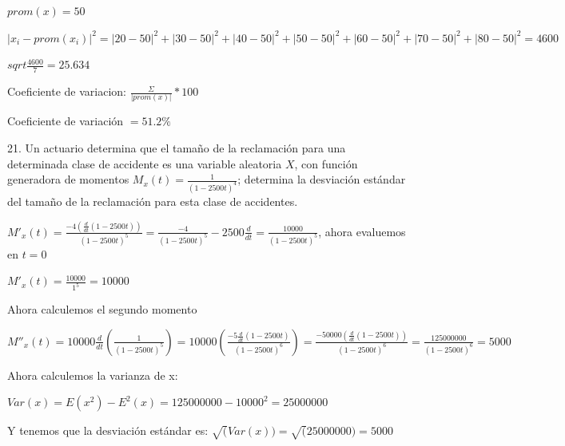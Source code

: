 \documentclass{article}
\begin{document}
        $prom(x) = 50$\vspace{.1cm}

        $|x_{i}-prom(x_{i})|^2 = |20-50|^2 + |30-50|^2 + |40-50|^2 
        + |50-50|^2 + |60-50|^2 + |70-50|^2 + |80-50|^2 = 4600$\vspace{.1cm}

        $sqrt{\frac{4600}{7}} = 25.634$\vspace{.1cm}

        Coeficiente de variacion: $\frac{\Sigma}{|prom(x)|}*100$\vspace{.1cm}

        Coeficiente de variación $= 51.2\%$

        21. Un actuario determina que el tamaño de la reclamación 
        para una determinada clase de accidente es una variable 
        aleatoria $X$, con función generadora de momentos 
        $M_x(t)=\frac{1}{(1-2500t)^4}$; determina la desviación 
        estándar del tamaño de la reclamación para esta clase de 
        accidentes.\vspace{.1cm}

        \vspace{.1cm}

        $M'_x(t)=\frac{-4(\frac{d}{dt}(1-2500t))}{(1-2500t)^5} 
        = \frac{-4}{(1-2500t)^5}-2500\frac{d}{dt} = \frac{10000}{(1-2500t)^5}$, 
        ahora evaluemos en $t=0$ \vspace{.1cm}

        $M'_x(t) = \frac{10000}{1^5}= 10000$\vspace{.1cm}

        Ahora calculemos el segundo momento\vspace{.1cm}

        $M''_x(t) = 10000 \frac{d}{dt}(\frac{1}{(1-2500t)^5}) = 
        10000 (\frac{-5\frac{d}{dt}(1-2500t)}{(1-2500t)^6}) = 
        \frac{-50000(\frac{d}{dt}(1-2500t))}{(1-2500t)^6} = 
        \frac{125000000}{(1-2500t)^6} = 5000$ \vspace{.1cm}

        Ahora calculemos la varianza de x: \vspace{.1cm}

        $Var(x) = E(x^2) - E^2(x) = 125000000 - 10000^2 = 25000000$\vspace{.1cm}

        Y tenemos que la desviación estándar es: $\displaystyle\sqrt(Var(x)) 
        = \displaystyle\sqrt(25000000) = 5000$\vspace{.3cm}
\end{document}
